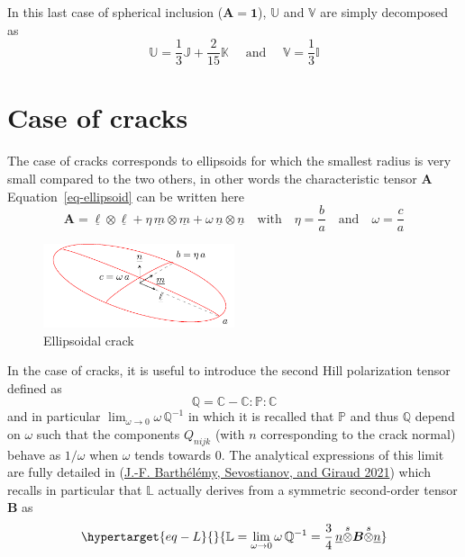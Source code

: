 \documentclass[
  letterpaper,
  DIV=11,
  numbers=noendperiod]{scrreprt}
\begin{document}
In this last case of spherical inclusion
(\({\mathbf{\boldsymbol{{A}}}}={\mathbf{\boldsymbol{{1}}}}\)),
\({\mathbb{{U}}}\) and \({\mathbb{{V}}}\) are simply decomposed as \[
{\mathbb{{U}}}=\frac{1}{3}{\mathbb{{J}}}+\frac{2}{15}{\mathbb{{K}}}
\quad\textrm{ and }\quad
{\mathbb{{V}}}=\frac{1}{3}{\mathbb{{I}}}
\]

\hypertarget{case-of-cracks}{%
\section{Case of cracks}\label{case-of-cracks}}

The case of cracks corresponds to ellipsoids for which the smallest
radius is very small compared to the two others, in other words the
characteristic tensor \({\mathbf{\boldsymbol{{A}}}}\)
Equation~\ref{eq-ellipsoid} can be written here \[
{\mathbf{\boldsymbol{{A}}}}=
{\underline{{\ell}}}\otimes{\underline{{\ell}}}+
\eta\,{\underline{{m}}}\otimes{\underline{{m}}}+
\omega\,{\underline{{n}}}\otimes{\underline{{n}}}
\quad\textrm{with}\quad
\eta=\frac{b}{a}
\quad\textrm{and}\quad
\omega=\frac{c}{a}
\]

\begin{figure}

{\centering 

\includegraphics[width=0.5\textwidth,height=\textheight]{./images/ellipsoidalcrack.pdf}

}

\caption{\label{fig-crack}Ellipsoidal crack}

\end{figure}

In the case of cracks, it is useful to introduce the second Hill
polarization tensor defined as \[
{\mathbb{{Q}}}={\mathbb{{C}}}-{\mathbb{{C}}}:{\mathbb{{P}}}:{\mathbb{{C}}}
\] and in particular \(\lim_{\omega\to 0}\omega\,{\mathbb{{Q}}}^{-1}\)
in which it is recalled that \({\mathbb{{P}}}\) and thus
\({\mathbb{{Q}}}\) depend on \(\omega\) such that the components
\(Q_{nijk}\) (with \(n\) corresponding to the crack normal) behave as
\(1/\omega\) when \(\omega\) tends towards \(0\). The analytical
expressions of this limit are fully detailed in
(\protect\hyperlink{ref-barthelemy2021}{J.-F. Barthélémy, Sevostianov,
and Giraud 2021}) which recalls in particular that \({\mathbb{{L}}}\)
actually derives from a symmetric second-order tensor
\({\mathbf{\boldsymbol{{B}}}}\) as
\begin{equation}\protect\hypertarget{eq-L}{}{
{\mathbb{{L}}}=
\lim_{\omega\to 0} \omega\,{\mathbb{{Q}}}^{-1}
=\frac{3}{4}\,{\underline{{n}}}{\stackrel{s}{\otimes}}{\mathbf{\boldsymbol{{B}}}}{\stackrel{s}{\otimes}}{\underline{{n}}}
}\label{eq-L}\end{equation}
\end{document}
